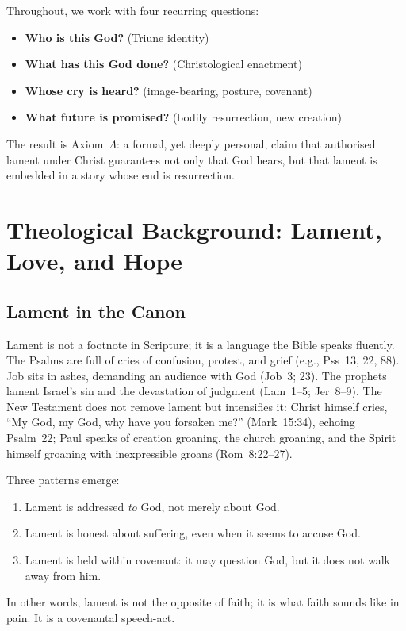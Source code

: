 \documentclass[11pt]{article}
\begin{document}
Throughout, we work with four recurring questions:
\begin{itemize}
  \item \textbf{Who is this God?} (Triune identity)
  \item \textbf{What has this God done?} (Christological enactment)
  \item \textbf{Whose cry is heard?} (image-bearing, posture, covenant)
  \item \textbf{What future is promised?} (bodily resurrection, new creation)
\end{itemize}

The result is Axiom~$\Lambda$: a formal, yet deeply personal, claim that authorised lament under Christ guarantees not only that God hears, but that lament is embedded in a story whose end is resurrection.

\section{Theological Background: Lament, Love, and Hope}

\subsection{Lament in the Canon}

Lament is not a footnote in Scripture; it is a language the Bible speaks fluently. The Psalms are full of cries of confusion, protest, and grief (e.g., Pss~13, 22, 88). Job sits in ashes, demanding an audience with God (Job~3; 23). The prophets lament Israel's sin and the devastation of judgment (Lam~1--5; Jer~8--9). The New Testament does not remove lament but intensifies it: Christ himself cries, ``My God, my God, why have you forsaken me?'' (Mark~15:34), echoing Psalm~22; Paul speaks of creation groaning, the church groaning, and the Spirit himself groaning with inexpressible groans (Rom~8:22--27).

Three patterns emerge:
\begin{enumerate}[label=(\alph*)]
  \item Lament is addressed \emph{to} God, not merely about God.
  \item Lament is honest about suffering, even when it seems to accuse God.
  \item Lament is held within covenant: it may question God, but it does not walk away from him.
\end{enumerate}

In other words, lament is not the opposite of faith; it is what faith sounds like in pain. It is a covenantal speech-act.
\end{document}
